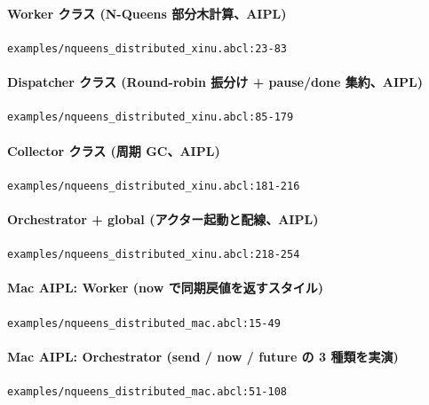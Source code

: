 \documentclass[a4paper,11pt]{ltjsarticle}
\begin{document}
\paragraph{Worker クラス (N-Queens 部分木計算、AIPL)} \hfill
\texttt{examples/nqueens\_distributed\_xinu.abcl:23-83}


\paragraph{Dispatcher クラス (Round-robin 振分け + pause/done 集約、AIPL)} \hfill
\texttt{examples/nqueens\_distributed\_xinu.abcl:85-179}


\paragraph{Collector クラス (周期 GC、AIPL)} \hfill
\texttt{examples/nqueens\_distributed\_xinu.abcl:181-216}


\paragraph{Orchestrator + global (アクター起動と配線、AIPL)} \hfill
\texttt{examples/nqueens\_distributed\_xinu.abcl:218-254}


\paragraph{Mac AIPL: Worker (now で同期戻値を返すスタイル)} \hfill
\texttt{examples/nqueens\_distributed\_mac.abcl:15-49}


\paragraph{Mac AIPL: Orchestrator (send / now / future の 3 種類を実演)} \hfill
\texttt{examples/nqueens\_distributed\_mac.abcl:51-108}

\end{document}
